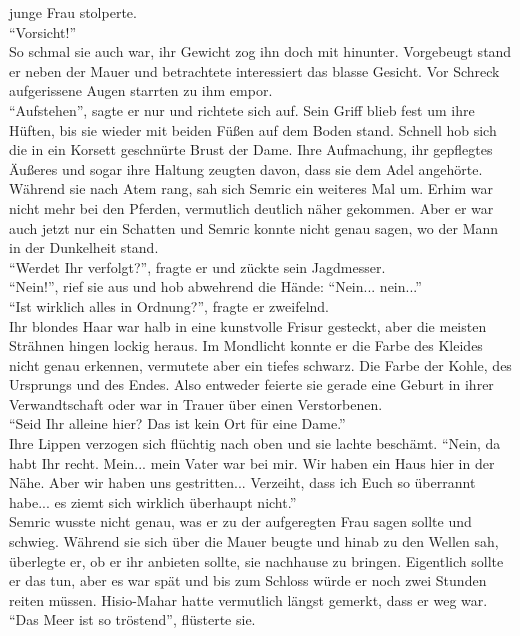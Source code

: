 junge Frau stolperte. \\
``Vorsicht!''\\
So schmal sie auch war, ihr Gewicht zog ihn doch mit hinunter. Vorgebeugt stand er neben der Mauer 
und betrachtete interessiert das blasse Gesicht. Vor Schreck aufgerissene Augen starrten zu ihm 
empor. \\
``Aufstehen'', sagte er nur und richtete sich auf. Sein Griff blieb fest um ihre Hüften, bis sie 
wieder mit beiden Füßen auf dem Boden stand. Schnell hob sich die in ein Korsett geschnürte Brust 
der Dame. Ihre Aufmachung, ihr gepflegtes Äußeres und sogar ihre Haltung zeugten davon, dass sie 
dem Adel angehörte. Während sie nach Atem rang, sah sich Semric ein weiteres Mal um. Erhim war 
nicht mehr bei den Pferden, vermutlich deutlich näher gekommen. Aber er war auch jetzt nur ein 
Schatten und Semric konnte nicht genau sagen, wo der Mann in der Dunkelheit stand.\\
``Werdet Ihr verfolgt?'', fragte er und zückte sein Jagdmesser.\\
``Nein!'', rief sie aus und hob abwehrend die Hände: ``Nein... nein...''\\
``Ist wirklich alles in Ordnung?'', fragte er zweifelnd.\\
Ihr blondes Haar war halb in eine kunstvolle Frisur gesteckt, aber die meisten Strähnen hingen 
lockig heraus. Im Mondlicht konnte er die Farbe des Kleides nicht genau erkennen, vermutete aber 
ein tiefes schwarz. Die Farbe der Kohle, des Ursprungs und des Endes. Also entweder feierte sie 
gerade eine Geburt in ihrer Verwandtschaft oder war in Trauer über einen Verstorbenen.\\
``Seid Ihr alleine hier? Das ist kein Ort für eine Dame.''\\
Ihre Lippen verzogen sich flüchtig nach oben und sie lachte beschämt. ``Nein, da habt Ihr recht. 
Mein... mein Vater war bei mir. Wir haben ein Haus hier in der Nähe. Aber wir haben uns 
gestritten... Verzeiht, dass ich Euch so überrannt habe... es ziemt sich wirklich überhaupt 
nicht.''\\
Semric wusste nicht genau, was er zu der aufgeregten Frau sagen sollte und schwieg. Während sie 
sich über die Mauer beugte und hinab zu den Wellen sah, überlegte er, ob er ihr anbieten sollte, 
sie nachhause zu bringen. Eigentlich sollte er das tun, aber es war spät und bis zum Schloss würde 
er noch zwei Stunden reiten müssen. Hisio-Mahar hatte vermutlich längst gemerkt, dass er weg war.\\
``Das Meer ist so tröstend'', flüsterte sie.\\
